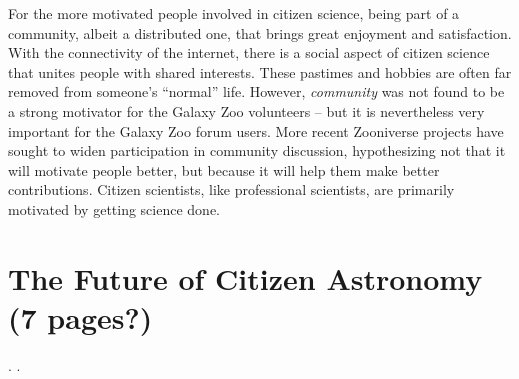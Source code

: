 \documentclass{ar2e}
\begin{document}
For the more motivated people involved in citizen science, being part of a
community,  albeit a distributed one, that brings great enjoyment and
satisfaction.  With the connectivity of the internet, there is a social  aspect
of citizen science that unites people with shared interests.   These pastimes
and hobbies are often far removed from someone's ``normal''  life. However, {\it
community} was not found to be a strong motivator for the Galaxy Zoo volunteers
-- but it is nevertheless very important for the Galaxy Zoo forum users. More
recent Zooniverse projects have sought to widen participation in community
discussion, hypothesizing not that it will motivate people better, but because
it will help them make better contributions. Citizen scientists, like
professional scientists, are primarily motivated by getting science done.



\section{The Future of Citizen Astronomy (7 pages?)}
\label{sec:future}

.
.

% 
%
% 
%
%
% 
\end{document}
